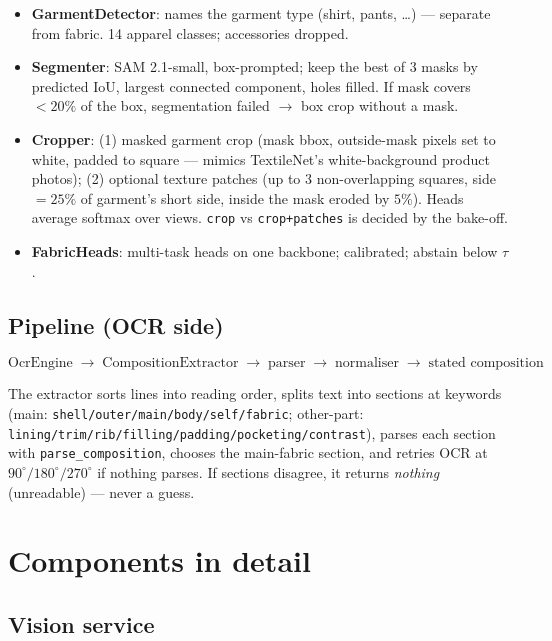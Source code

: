 \documentclass[11pt,a4paper]{article}
\begin{document}
\begin{itemize}[leftmargin=*]
  \item \textbf{GarmentDetector}: names the garment type (shirt, pants, \dots) ---
        separate from fabric. 14 apparel classes; accessories dropped.
  \item \textbf{Segmenter}: SAM 2.1-small, box-prompted; keep the best of 3 masks by
        predicted IoU, largest connected component, holes filled. If mask covers
        $<20\%$ of the box, segmentation failed $\to$ box crop without a mask.
  \item \textbf{Cropper}: (1) masked garment crop (mask bbox, outside-mask pixels set
        to white, padded to square --- mimics TextileNet's white-background product
        photos); (2) optional texture patches (up to 3 non-overlapping squares,
        side $=25\%$ of garment's short side, inside the mask eroded by $5\%$).
        Heads average softmax over views. \texttt{crop} vs \texttt{crop+patches} is
        decided by the bake-off.
  \item \textbf{FabricHeads}: multi-task heads on one backbone; calibrated; abstain
        below $\tau$.
\end{itemize}

\subsection{Pipeline (OCR side)}

\[
\text{OcrEngine} \;\to\; \text{CompositionExtractor} \;\to\; \text{parser}
\;\to\; \text{normaliser} \;\to\; \text{stated composition}
\]

The extractor sorts lines into reading order, splits text into sections at keywords
(main: \texttt{shell/outer/main/body/self/fabric}; other-part:
\texttt{lining/trim/rib/filling/padding/pocketing/contrast}), parses each section
with \texttt{parse\_composition}, chooses the main-fabric section, and retries OCR
at $90^\circ/180^\circ/270^\circ$ if nothing parses. If sections disagree, it
returns \emph{nothing} (unreadable) --- never a guess.

\section{Components in detail}

\subsection{Vision service}
\end{document}
